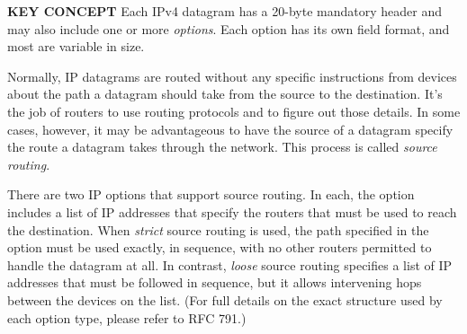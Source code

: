 {\textbf{KEY CONCEPT}} Each IPv4 datagram has a 20-byte mandatory header
and may also include one or more {\emph{options}}. Each option has its
own field format, and most are variable in size.

Normally, IP datagrams are routed without any specific instructions from
devices about the path a datagram should take from the source to the
destination. It's the job of routers to use routing protocols and to
figure out those details. In some cases, however, it may be advantageous
to have the source of a datagram specify the route a datagram takes
through the network. This process is called {\emph{source routing}}.

There are two IP options that support source routing. In each, the
option includes a list of IP addresses that specify the routers that
must be used to reach the destination. When {\emph{strict}} source
routing is used, the path specified in the option must be used exactly,
in sequence, with no other routers permitted to handle the datagram at
all. In contrast, {\emph{loose}} source routing specifies a list of IP
addresses that must be followed in sequence, but it allows intervening
hops between the devices on the list. (For full details on the exact
structure used by each option type, please refer to RFC 791.)
